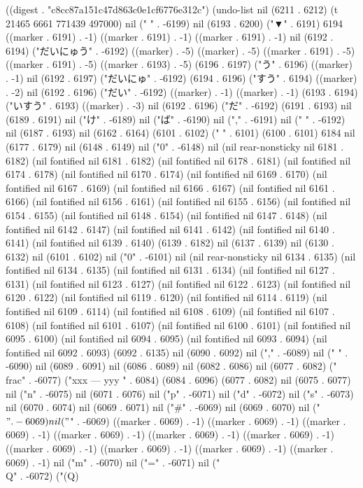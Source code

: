 
((digest . "c8cc87a151c47d863c0e1cf6776e312c") (undo-list nil (6211 . 6212) (t 21465 6661 771439 497000) nil (" " . -6199) nil (6193 . 6200) ("▼" . 6191) 6194 ((marker . 6191) . -1) ((marker . 6191) . -1) ((marker . 6191) . -1) nil (6192 . 6194) ("だいにゅう" . -6192) ((marker) . -5) ((marker) . -5) ((marker . 6191) . -5) ((marker . 6191) . -5) ((marker . 6193) . -5) (6196 . 6197) ("う" . 6196) ((marker) . -1) nil (6192 . 6197) ("だいにゅ" . -6192) (6194 . 6196) ("すう" . 6194) ((marker) . -2) nil (6192 . 6196) ("だい" . -6192) ((marker) . -1) ((marker) . -1) (6193 . 6194) ("いすう" . 6193) ((marker) . -3) nil (6192 . 6196) ("だ" . -6192) (6191 . 6193) nil (6189 . 6191) nil ("け" . -6189) nil ("ば" . -6190) nil ("," . -6191) nil (" " . -6192) nil (6187 . 6193) nil (6162 . 6164) (6101 . 6102) (" " . 6101) (6100 . 6101) 6184 nil (6177 . 6179) nil (6148 . 6149) nil ("0" . -6148) nil (nil rear-nonsticky nil 6181 . 6182) (nil fontified nil 6181 . 6182) (nil fontified nil 6178 . 6181) (nil fontified nil 6174 . 6178) (nil fontified nil 6170 . 6174) (nil fontified nil 6169 . 6170) (nil fontified nil 6167 . 6169) (nil fontified nil 6166 . 6167) (nil fontified nil 6161 . 6166) (nil fontified nil 6156 . 6161) (nil fontified nil 6155 . 6156) (nil fontified nil 6154 . 6155) (nil fontified nil 6148 . 6154) (nil fontified nil 6147 . 6148) (nil fontified nil 6142 . 6147) (nil fontified nil 6141 . 6142) (nil fontified nil 6140 . 6141) (nil fontified nil 6139 . 6140) (6139 . 6182) nil (6137 . 6139) nil (6130 . 6132) nil (6101 . 6102) nil ("0" . -6101) nil (nil rear-nonsticky nil 6134 . 6135) (nil fontified nil 6134 . 6135) (nil fontified nil 6131 . 6134) (nil fontified nil 6127 . 6131) (nil fontified nil 6123 . 6127) (nil fontified nil 6122 . 6123) (nil fontified nil 6120 . 6122) (nil fontified nil 6119 . 6120) (nil fontified nil 6114 . 6119) (nil fontified nil 6109 . 6114) (nil fontified nil 6108 . 6109) (nil fontified nil 6107 . 6108) (nil fontified nil 6101 . 6107) (nil fontified nil 6100 . 6101) (nil fontified nil 6095 . 6100) (nil fontified nil 6094 . 6095) (nil fontified nil 6093 . 6094) (nil fontified nil 6092 . 6093) (6092 . 6135) nil (6090 . 6092) nil ("," . -6089) nil (" " . -6090) nil (6089 . 6091) nil (6086 . 6089) nil (6082 . 6086) nil (6077 . 6082) ("\\frac" . -6077) ("xxx
---
yyy
" . 6084) (6084 . 6096) (6077 . 6082) nil (6075 . 6077) nil ("n" . -6075) nil (6071 . 6076) nil ("p" . -6071) nil ("d" . -6072) nil ("s" . -6073) nil (6070 . 6074) nil (6069 . 6071) nil ("#" . -6069) nil (6069 . 6070) nil ("$" . -6069) nil ("$" . -6069) ((marker . 6069) . -1) ((marker . 6069) . -1) ((marker . 6069) . -1) ((marker . 6069) . -1) ((marker . 6069) . -1) ((marker . 6069) . -1) ((marker . 6069) . -1) ((marker . 6069) . -1) ((marker . 6069) . -1) ((marker . 6069) . -1) nil ("m" . -6070) nil ("=" . -6071) nil ("\\Q" . -6072) ("(Q)
